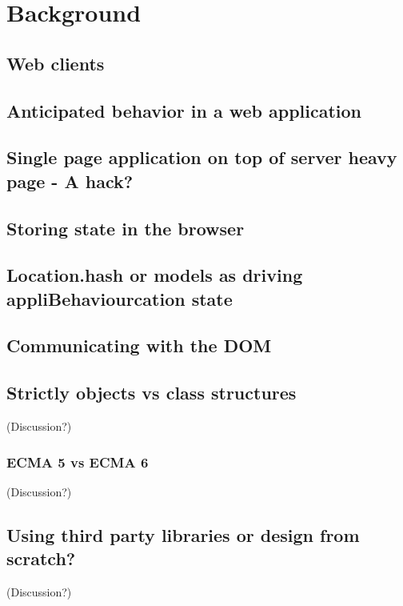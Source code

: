 \documentclass[english]{article}
\begin{document}

\section{Background}

\subsection{Web clients}

\subsection{Anticipated behavior in a web application}

\subsection{Single page application on top of server heavy page - A hack?}

\subsection{Storing state in the browser}

\subsection{Location.hash or models as driving appliBehaviourcation state}

\subsection{Communicating with the DOM}

\subsection{Strictly objects vs class structures} (Discussion?)
\subsubsection{ECMA 5 vs ECMA 6} (Discussion?)

\subsection{Using third party libraries or design from scratch?} (Discussion?)
\end{document}
